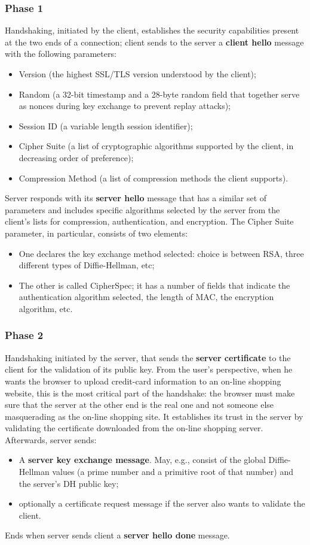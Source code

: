 \documentclass[a4paper, 10pt, titlepage]{article}
\begin{document}
\subsubsection{Phase 1}
Handshaking, initiated by the client, establishes the security capabilities present at the two ends of a connection; client sends to the server a \textbf{client hello} message with the following parameters:
\begin{itemize}
\item Version (the highest SSL/TLS version understood by the client);
\item Random (a 32-bit timestamp and a 28-byte random field that together serve as nonces during key exchange to prevent replay attacks);
\item Session ID (a variable length session identifier);
\item Cipher Suite (a list of cryptographic algorithms supported by the client, in decreasing order of preference);
\item Compression Method (a list of compression methods the client supports).
\end{itemize}
Server responds with its \textbf{server hello} message that has a similar set of parameters and includes specific algorithms selected by the server from the client’s lists for compression, authentication, and encryption. The Cipher Suite parameter, in particular, consists of two elements:
\begin{itemize}
\item One declares the key exchange method selected: choice is between RSA, three different types of Diffie-Hellman, etc;
\item The other is called CipherSpec; it has a number of fields that indicate the authentication algorithm selected, the length of MAC, the encryption algorithm, etc.
\end{itemize}
\subsubsection{Phase 2}
Handshaking initiated by the server, that sends the \textbf{server certificate} to the client for the validation of its public key. From the user's perspective, when he wants the browser to upload credit-card information to an on-line shopping website, this is the most critical part of the handshake: the browser must make sure that the server at the other end is the real one and not someone else masquerading as the on-line shopping site. It establishes its trust in the server by validating the certificate downloaded from the on-line shopping server. Afterwards, server sends:
\begin{itemize}
\item A \textbf{server key exchange message}. May, e.g., consist of the global Diffie-Hellman values (a prime number and a primitive root of that number) and the server’s DH public key;
\item optionally a certificate request message if the server also wants to validate the client.
\end{itemize}
Ends when server sends client a \textbf{server hello done} message.
\end{document}
